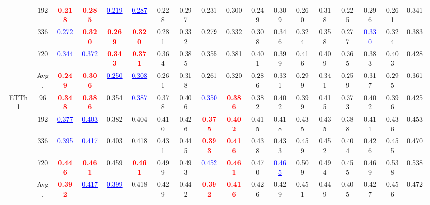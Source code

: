 \begin{table}[t]
{\begin{tabular}{cc|cc|cc|cc|cc|cc|cc|cc|cc}
 & 192 & \textcolor{red}{\textbf{0.218}} & \textcolor{red}{\textbf{0.285}} & \textcolor{blue}{\underline{0.219}} & \textcolor{blue}{\underline{0.287}} & 0.228 & 0.297 & 0.231 & 0.300 & 0.249 & 0.309 & 0.260 & 0.318 & 0.225 & 0.296 & 0.261 & 0.341 \\
 & 336 & \textcolor{blue}{\underline{0.272}} & \textcolor{red}{\textbf{0.320}} & \textcolor{red}{\textbf{0.269}} & \textcolor{red}{\textbf{0.320}} & 0.281 & 0.332 & 0.279 & 0.332 & 0.308 & 0.346 & 0.324 & 0.358 & 0.277 & \textcolor{blue}{\underline{0.330}} & 0.324 & 0.383 \\
 & 720 & \textcolor{blue}{\underline{0.344}} & \textcolor{blue}{\underline{0.372}} & \textcolor{red}{\textbf{0.343}} & \textcolor{red}{\textbf{0.371}} & 0.364 & 0.385 & 0.355 & 0.381 & 0.401 & 0.399 & 0.416 & 0.409 & 0.365 & 0.383 & 0.403 & 0.428 \\
\cmidrule(lr){2-18}
 & Avg. & \textcolor{red}{\textbf{0.249}} & \textcolor{red}{\textbf{0.306}} & \textcolor{blue}{\underline{0.250}} & \textcolor{blue}{\underline{0.308}} & 0.261 & 0.318 & 0.261 & 0.320 & 0.286 & 0.331 & 0.299 & 0.341 & 0.259 & 0.317 & 0.295 & 0.361 \\
\midrule
\multirow{5}{*}{ETTh1} & 96 & \textcolor{red}{\textbf{0.348}} & \textcolor{red}{\textbf{0.386}} & 0.354 & \textcolor{blue}{\underline{0.387}} & 0.378 & 0.406 & \textcolor{blue}{\underline{0.350}} & \textcolor{red}{\textbf{0.386}} & 0.382 & 0.402 & 0.399 & 0.415 & 0.373 & 0.402 & 0.396 & 0.425 \\
 & 192 & \textcolor{blue}{\underline{0.377}} & \textcolor{blue}{\underline{0.403}} & 0.382 & 0.404 & 0.410 & 0.426 & \textcolor{red}{\textbf{0.375}} & \textcolor{red}{\textbf{0.402}} & 0.415 & 0.418 & 0.435 & 0.435 & 0.388 & 0.411 & 0.436 & 0.453 \\
 & 336 & \textcolor{blue}{\underline{0.395}} & \textcolor{blue}{\underline{0.417}} & 0.403 & 0.418 & 0.431 & 0.445 & \textcolor{red}{\textbf{0.393}} & \textcolor{red}{\textbf{0.416}} & 0.438 & 0.433 & 0.459 & 0.452 & 0.404 & 0.426 & 0.455 & 0.470 \\
 & 720 & \textcolor{red}{\textbf{0.446}} & \textcolor{red}{\textbf{0.461}} & 0.459 & \textcolor{red}{\textbf{0.461}} & 0.499 & 0.493 & \textcolor{blue}{\underline{0.452}} & \textcolor{red}{\textbf{0.461}} & 0.470 & \textcolor{blue}{\underline{0.465}} & 0.509 & 0.494 & 0.455 & 0.469 & 0.538 & 0.538 \\
\cmidrule(lr){2-18}
 & Avg. & \textcolor{red}{\textbf{0.392}} & \textcolor{blue}{\underline{0.417}} & \textcolor{blue}{\underline{0.399}} & 0.418 & 0.429 & 0.442 & \textcolor{red}{\textbf{0.392}} & \textcolor{red}{\textbf{0.416}} & 0.426 & 0.429 & 0.451 & 0.449 & 0.405 & 0.427 & 0.456 & 0.472 \\

\end{tabular}}
\end{table}
